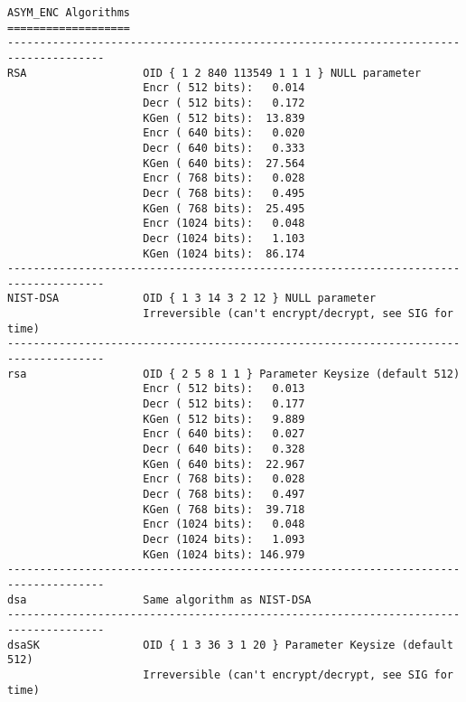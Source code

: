{\begin{verbatim}
ASYM_ENC Algorithms
===================
-------------------------------------------------------------------------------------
RSA                  OID { 1 2 840 113549 1 1 1 } NULL parameter
                     Encr ( 512 bits):   0.014  
                     Decr ( 512 bits):   0.172  
                     KGen ( 512 bits):  13.839  
                     Encr ( 640 bits):   0.020  
                     Decr ( 640 bits):   0.333  
                     KGen ( 640 bits):  27.564  
                     Encr ( 768 bits):   0.028  
                     Decr ( 768 bits):   0.495  
                     KGen ( 768 bits):  25.495  
                     Encr (1024 bits):   0.048  
                     Decr (1024 bits):   1.103  
                     KGen (1024 bits):  86.174  
-------------------------------------------------------------------------------------
NIST-DSA             OID { 1 3 14 3 2 12 } NULL parameter
                     Irreversible (can't encrypt/decrypt, see SIG for time)
-------------------------------------------------------------------------------------
rsa                  OID { 2 5 8 1 1 } Parameter Keysize (default 512)
                     Encr ( 512 bits):   0.013  
                     Decr ( 512 bits):   0.177  
                     KGen ( 512 bits):   9.889  
                     Encr ( 640 bits):   0.027  
                     Decr ( 640 bits):   0.328  
                     KGen ( 640 bits):  22.967  
                     Encr ( 768 bits):   0.028  
                     Decr ( 768 bits):   0.497  
                     KGen ( 768 bits):  39.718  
                     Encr (1024 bits):   0.048  
                     Decr (1024 bits):   1.093  
                     KGen (1024 bits): 146.979  
-------------------------------------------------------------------------------------
dsa                  Same algorithm as NIST-DSA
-------------------------------------------------------------------------------------
dsaSK                OID { 1 3 36 3 1 20 } Parameter Keysize (default 512)
                     Irreversible (can't encrypt/decrypt, see SIG for time)


\end{verbatim}}

